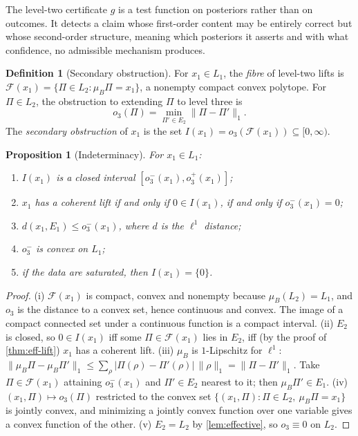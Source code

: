 \documentclass[11pt]{article}
\newtheorem{proposition}[theorem]{Proposition}
\theoremstyle{definition}
\newtheorem{definition}[theorem]{Definition}
\theoremstyle{remark}
\begin{document}
The level-two certificate $g$ is a test function on posteriors rather than on outcomes. It detects a
claim whose first-order content may be entirely correct but whose second-order structure, meaning
which posteriors it asserts and with what confidence, no admissible mechanism produces.

\begin{definition}[Secondary obstruction]\label{def:secondary}
For $x_1\in L_1$, the \emph{fibre} of level-two lifts is $\mathcal{F}(x_1)=\{\Pi\in L_2:\mu_B\Pi=x_1\}$,
a nonempty compact convex polytope. For $\Pi\in L_2$, the obstruction to extending $\Pi$ to level three
is
\[
o_3(\Pi)=\min_{\Pi'\in E_2}\lVert\Pi-\Pi'\rVert_1 .
\]
The \emph{secondary obstruction} of $x_1$ is the set $I(x_1)=o_3(\mathcal{F}(x_1))\subseteq[0,\infty)$.
\end{definition}

\begin{proposition}[Indeterminacy]\label{prop:indeterminacy}
For $x_1\in L_1$:
\begin{enumerate}[label=(\roman*)]
\item $I(x_1)$ is a closed interval $[o_3^-(x_1),o_3^+(x_1)]$;
\item $x_1$ has a coherent lift if and only if $0\in I(x_1)$, if and only if $o_3^-(x_1)=0$;
\item $d(x_1,E_1)\le o_3^-(x_1)$, where $d$ is the $\ell^1$ distance;
\item $o_3^-$ is convex on $L_1$;
\item if the data are saturated, then $I(x_1)=\{0\}$.
\end{enumerate}
\end{proposition}
\begin{proof}
(i) $\mathcal{F}(x_1)$ is compact, convex and nonempty because $\mu_B(L_2)=L_1$, and $o_3$ is the
distance to a convex set, hence continuous and convex. The image of a compact connected set under a
continuous function is a compact interval.
(ii) $E_2$ is closed, so $0\in I(x_1)$ iff some $\Pi\in\mathcal{F}(x_1)$ lies in $E_2$, iff (by the
proof of \cref{thm:eff-lift}) $x_1$ has a coherent lift.
(iii) $\mu_B$ is $1$-Lipschitz for $\ell^1$: $\lVert\mu_B\Pi-\mu_B\Pi'\rVert_1\le\sum_\rho
\lvert\Pi(\rho)-\Pi'(\rho)\rvert\,\lVert\rho\rVert_1=\lVert\Pi-\Pi'\rVert_1$. Take $\Pi\in\mathcal{F}(x_1)$
attaining $o_3^-(x_1)$ and $\Pi'\in E_2$ nearest to it; then $\mu_B\Pi'\in E_1$.
(iv) $(x_1,\Pi)\mapsto o_3(\Pi)$ restricted to the convex set $\{(x_1,\Pi):\Pi\in L_2,\ \mu_B\Pi=x_1\}$ is
jointly convex, and minimizing a jointly convex function over one variable gives a convex function of
the other.
(v) $E_2=L_2$ by \cref{lem:effective}, so $o_3\equiv0$ on $L_2$.
\end{proof}
\end{document}
